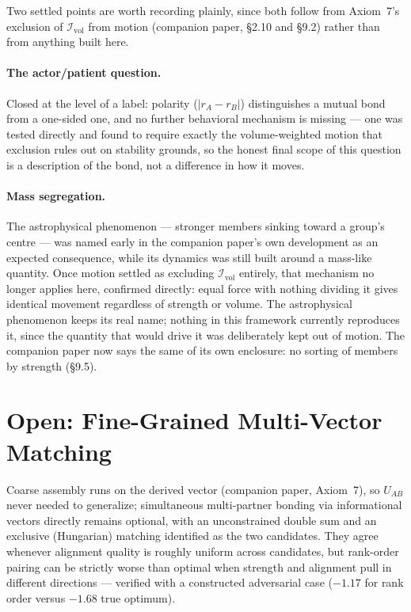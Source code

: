 \documentclass[12pt, a4paper]{article}
\begin{document}
Two settled points are worth recording plainly, since both follow
from Axiom~7's exclusion of $\mathcal{I}_{\mathrm{vol}}$ from motion (companion paper, \S2.10 and \S9.2) rather than from anything built
here.

\paragraph{The actor/patient question.} Closed at the level of a
label: polarity ($\lvert r_A-r_B\rvert$) distinguishes a mutual bond
from a one-sided one, and no further behavioral mechanism is
missing --- one was tested directly and found to require exactly
the volume-weighted motion that exclusion rules out on stability
grounds, so the honest final scope of this question is a
description of the bond, not a difference in how it moves.

\paragraph{Mass segregation.} The astrophysical phenomenon ---
stronger members sinking toward a group's centre --- was named
early in the companion paper's own development as an expected
consequence, while its dynamics was still built around a mass-like
quantity. Once motion settled as excluding $\mathcal{I}_{\mathrm{vol}}$
entirely, that mechanism no longer applies here, confirmed directly:
equal force with nothing dividing it gives identical movement
regardless of strength or volume. The astrophysical phenomenon keeps
its real name; nothing in this framework currently reproduces it,
since the quantity that would drive it was deliberately kept out of motion. The companion paper
now says the same of its own enclosure: no sorting of members by strength (\S9.5).

\section{Open: Fine-Grained Multi-Vector Matching}
\label{sec:open_matching}

Coarse assembly runs on the derived vector (companion paper,
Axiom~7), so $U_{AB}$ never needed to generalize; simultaneous
multi-partner bonding via informational vectors directly remains
optional, with an unconstrained double sum and an exclusive
(Hungarian) matching identified as the two candidates. They agree
whenever alignment quality is roughly uniform across candidates, but
rank-order pairing can be strictly worse than optimal when strength
and alignment pull in different directions --- verified with a
constructed adversarial case ($-1.17$ for rank order versus $-1.68$
true optimum).
\end{document}
